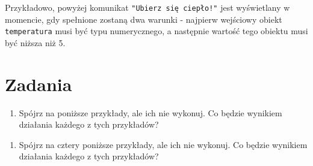\documentclass[paper=6in:9in,pagesize=pdftex,headinclude=on,footinclude=on,10pt]{scrbook}
\newenvironment{Shaded}{\begin{snugshade}}{\end{snugshade}}
\newcommand{\CommentTok}[1]{\textcolor[rgb]{0.56,0.35,0.01}{\textit{#1}}}
\newcommand{\DecValTok}[1]{\textcolor[rgb]{0.00,0.00,0.81}{#1}}
\newcommand{\KeywordTok}[1]{\textcolor[rgb]{0.13,0.29,0.53}{\textbf{#1}}}
\newcommand{\NormalTok}[1]{#1}
\newcommand{\OperatorTok}[1]{\textcolor[rgb]{0.81,0.36,0.00}{\textbf{#1}}}
\newcommand{\StringTok}[1]{\textcolor[rgb]{0.31,0.60,0.02}{#1}}
\providecommand{\tightlist}{%
  \setlength{\itemsep}{0pt}\setlength{\parskip}{0pt}}
\begin{document}
Przykładowo, powyżej komunikat \texttt{"Ubierz\ się\ ciepło!"} jest wyświetlany w momencie, gdy spełnione zostaną dwa warunki - najpierw wejściowy obiekt \texttt{temperatura} musi być typu numerycznego, a następnie wartość tego obiektu musi być niższa niż 5.

\hypertarget{zadania}{%
\section{Zadania}\label{zadania}}

\begin{enumerate}
\def\labelenumi{\arabic{enumi})}
\tightlist
\item
  Spójrz na poniższe przykłady, ale ich nie wykonuj.
  Co będzie wynikiem działania każdego z tych przykładów?
\end{enumerate}

\begin{Shaded}
\end{Shaded}

\begin{enumerate}
\def\labelenumi{\arabic{enumi})}
\setcounter{enumi}{1}
\tightlist
\item
  Spójrz na cztery poniższe przykłady, ale ich nie wykonuj.
  Co będzie wynikiem działania każdego z tych przykładów?
\end{enumerate}
\end{document}
